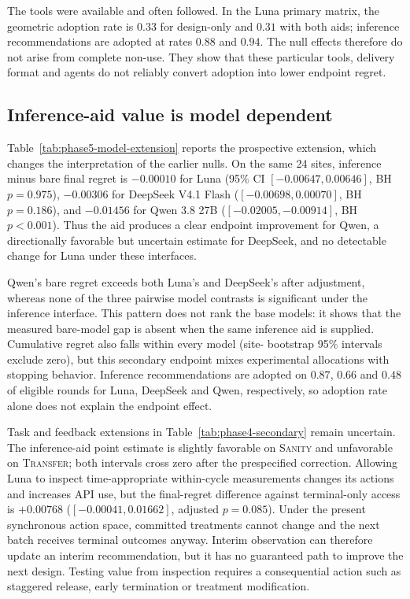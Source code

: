 The tools were available and often followed. In the Luna primary matrix, the geometric
adoption rate is $0.33$ for design-only and $0.31$ with both aids; inference recommendations
are adopted at rates $0.88$ and $0.94$. The null effects therefore do not arise from complete
non-use. They show that these particular tools, delivery format and agents do not reliably
convert adoption into lower endpoint regret.

\subsection{Inference-aid value is model dependent}



Table~\ref{tab:phase5-model-extension} reports the prospective extension, which changes
the interpretation of the earlier nulls. On the same 24
sites, inference minus bare final regret is $-0.00010$ for Luna (95\% CI
$[-0.00647,0.00646]$, BH $p=0.975$), $-0.00306$ for DeepSeek V4.1 Flash
($[-0.00698,0.00070]$, BH $p=0.186$), and $-0.01456$ for Qwen 3.8 27B
($[-0.02005,-0.00914]$, BH $p<0.001$). Thus the aid produces a clear endpoint improvement
for Qwen, a directionally favorable but uncertain estimate for DeepSeek, and no detectable
change for Luna under these interfaces.

Qwen's bare regret exceeds both Luna's and DeepSeek's after adjustment, whereas none of the
three pairwise model contrasts is significant under the inference interface. This pattern
does not rank the base models: it shows that the measured bare-model gap is absent when the
same inference aid is supplied. Cumulative regret also falls within every model (site-
bootstrap 95\% intervals exclude zero), but this secondary endpoint mixes experimental
allocations with stopping behavior. Inference recommendations are adopted on $0.87$, $0.66$
and $0.48$ of eligible rounds for Luna, DeepSeek and Qwen, respectively, so adoption rate
alone does not explain the endpoint effect.



Task and feedback extensions in Table~\ref{tab:phase4-secondary} remain uncertain. The
inference-aid point estimate is slightly favorable on \textsc{Sanity} and unfavorable on
\textsc{Transfer}; both intervals cross zero after the prespecified correction. Allowing
Luna to inspect time-appropriate within-cycle measurements changes its actions and increases
API use, but the final-regret difference against terminal-only access is $+0.00768$
($[-0.00041,0.01662]$, adjusted $p=0.085$). Under the present synchronous action space,
committed treatments cannot change and the next batch receives terminal outcomes anyway.
Interim observation can therefore update an interim recommendation, but it has no guaranteed
path to improve the next design. Testing value from inspection requires a consequential
action such as staggered release, early termination or treatment modification.

